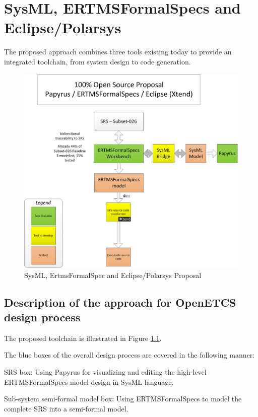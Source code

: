 \chapter{SysML, ERTMSFormalSpecs and Eclipse/Polarsys}
\label{sec:sysML-EFS}

The proposed approach combines three tools existing today to provide an integrated toolchain, from system design 
to code generation.

\begin{figure}[b!]
	\centering
		\includegraphics[width=\textwidth]{images/ERTMSFormalSpecsProposal_V3.png}
		\caption{SysML, ErtmsFormalSpec and Eclipse/Polarsys Proposal}
	\label{fig:ERTMSFormalSpecsProposal}
\end{figure}

\section{Description of the approach for OpenETCS design process}

The proposed toolchain is illustrated in Figure \ref{fig:ERTMSFormalSpecsProposal}.

The blue boxes of the overall design process are covered in the following manner:

SRS box: Using Papyrus for visualizing and editing the high-level ERTMSFormalSpecs model design in SysML language. 

Sub-system semi-formal model box: Using ERTMSFormalSpecs to model the complete SRS into a semi-formal model.

